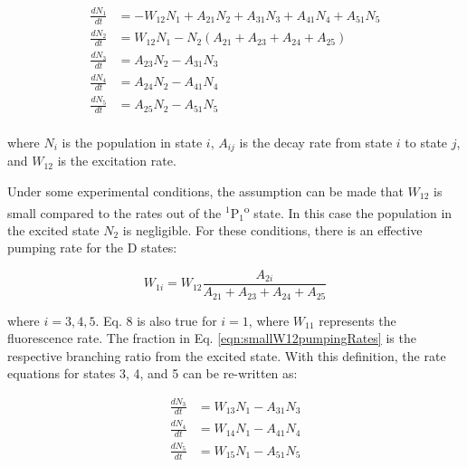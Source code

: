 
\begin{equation}
\begin{aligned}
\frac{dN_1}{dt} &= - W_{12}N_{1} + A_{21}N_{2} + A_{31}N_{3} + A_{41}N_{4} + A_{51} N_{5} \\
\frac{dN_2}{dt} &= W_{12}N_{1} - N_{2}(A_{21} + A_{23} + A_{24} + A_{25}) \\
\frac{dN_3}{dt} &= A_{23}N_{2} - A_{31}N_{3} \\
\frac{dN_4}{dt} &= A_{24}N_{2} - A_{41}N_{4} \\
\frac{dN_5}{dt} &= A_{25}N_{2} - A_{51}N_{5} \\
\end{aligned}
\label{eqn:rateEqn}
\end{equation}

\noindent
where $N_{i}$ is the population in state $i$, $A_{ij}$ is the decay rate from state $i$ to state $j$, and $W_{12}$ is the excitation rate.

Under some experimental conditions, the assumption can be made that $W_{12}$ is small compared to the rates out of the $^{1}$P$_{1}$\textsuperscript{o} state.  In this case the population in the excited state $N_{2}$ is negligible.  For these conditions, there is an effective pumping rate for the D states:

\begin{equation}
W_{1i} = W_{12}\frac{A_{2i}}{A_{21} + A_{23} + A_{24} + A_{25}}
\label{eqn:smallW12pumpingRates}
\end{equation}

\noindent
where $i = 3,4,5$.  Eq. 8 is also true for $i = 1$, where $W_{11}$ represents the fluorescence rate.  The fraction in Eq. \ref{eqn:smallW12pumpingRates} is the respective branching ratio from the excited state.  With this definition, the rate equations for states 3, 4, and 5 can be re-written as:


\begin{equation}
\begin{aligned}
\frac{dN_3}{dt} &= W_{13}N_{1} - A_{31}N_{3} \\
\frac{dN_4}{dt} &= W_{14}N_{1} - A_{41}N_{4} \\
\frac{dN_5}{dt} &= W_{15}N_{1} - A_{51}N_{5} \\
\end{aligned}
\label{eqn:smallW12populationRates}
\end{equation}

